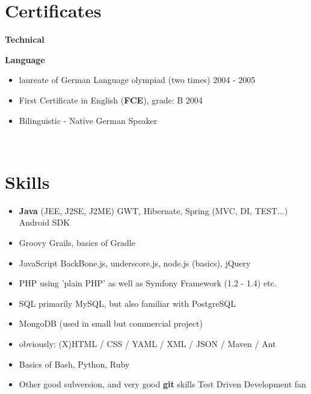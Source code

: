 \documentclass{res}
\begin{document}
\begin{resume}
\section{Certificates} 
{\bf Technical}
{\bf Language}
\begin{itemize}
 \item laureate of German Language olympiad (two times) \hfill 2004 - 2005
 \item First Certificate in English (\textbf{FCE}), grade: B \hfill 2004
 \item Bilinguistic - Native German Speaker
\end{itemize}

\\
\section{Skills}
\begin{itemize}
 \item \textbf{Java} (JEE, J2SE, J2ME)
 \subitem GWT, Hibernate, Spring (MVC, DI, TEST...)
 \subitem Android SDK
 \item Groovy
  \subitem Grails, basics of Gradle
 \item JavaScript
  \subitem BackBone.js, underscore.js, node.js (basics), jQuery
 \item PHP
  \subitem using 'plain PHP' as well as Symfony Framework (1.2 - 1.4) etc.
 \item SQL 
  \subitem primarily MySQL, but also familiar with PostgreSQL
 \item MongoDB (used in small but commercial project)
 \item obviously: (X)HTML / CSS / YAML / XML / JSON / Maven / Ant
 \item Basics of
  \subitem Bash, Python, Ruby
 \item Other
  \subitem good subversion, and very good \textbf{git} skills
  \subitem Test Driven Development fan
\end{itemize}


\end{resume}
\end{document}
